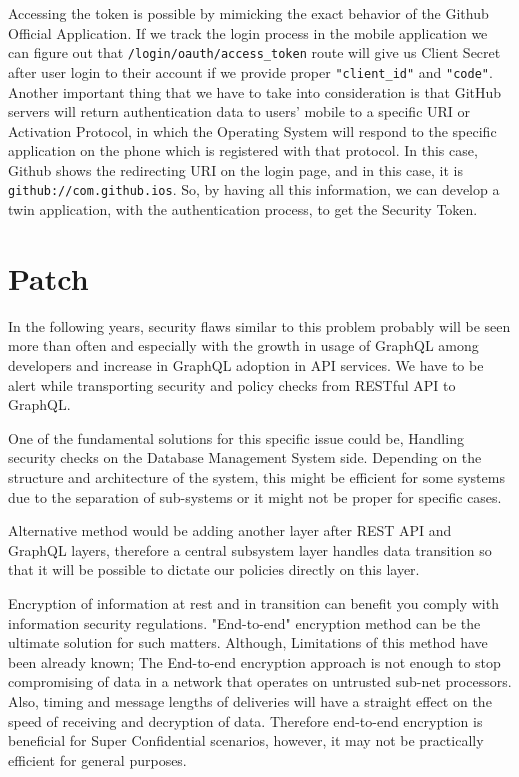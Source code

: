\documentclass[conference]{IEEEtran}
\begin{document}
Accessing the token is possible by mimicking the exact behavior of the Github Official Application. If we track the login process in the mobile application we can figure out that \verb|/login/oauth/access_token| route will give us Client Secret after user login to their account if we provide proper \verb|"client_id"| and \verb|"code"|. Another important thing that we have to take into consideration is that GitHub servers will return authentication data to users' mobile to a specific URI or Activation Protocol, in which the Operating System will respond to the specific application on the phone which is registered with that protocol. In this case, Github shows the redirecting URI on the login page, and in this case, it is \verb|github://com.github.ios|. So, by having all this information, we can develop a twin application, with the authentication process, to get the Security Token.
\section{Patch}

In the following years, security flaws similar to this problem probably will be seen more than often and especially with the growth in usage of GraphQL among developers and increase in GraphQL adoption in API services. 
    We have to be alert while transporting security and policy checks from RESTful API to GraphQL. 

One of the fundamental solutions for this specific issue could be, Handling security checks on the Database Management System side. Depending on the structure and architecture of the system, this might be efficient for some systems due to the separation of sub-systems or it might not be proper for specific cases. 

Alternative method would be adding another layer after REST API and GraphQL layers, therefore a central subsystem layer handles data transition so that it will be possible to dictate our policies directly on this layer.

Encryption of information at rest and in transition can benefit you comply with information security regulations\cite{owasp2017top}. "End-to-end" encryption method can be the ultimate solution for such matters. Although, Limitations of this method have been already known; The End-to-end encryption approach is not enough to stop compromising of data in a network that operates on untrusted sub-net processors\cite{padlipsky1978limitations}. Also, timing and message lengths of deliveries will have a straight effect on the speed of receiving and decryption of data. Therefore end-to-end encryption is beneficial for Super Confidential scenarios, however, it may not be practically efficient for general purposes.
\end{document}
